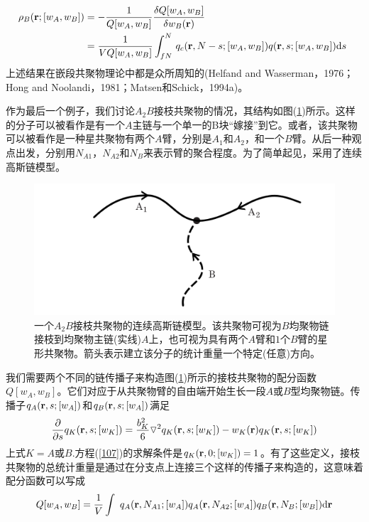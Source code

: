 \begin{equation}
\begin{aligned}
\rho _B(\mathbf{r};[w_A,w_B]) & =-\frac{1}{Q[w_A,w_B]}	\frac{\delta Q[w_A,w_B]}{\delta w_B(\mathbf{r})} \\
& =\frac{1}{VQ[w_A,w_B]} \int _{fN}^{N}\,q_c(\mathbf{r},N-s;[w_A,w_B])q(\mathbf{r},s;[w_A,w_B])\mathrm{d}s~ \\
\end{aligned}	
\end{equation}
上述结果在嵌段共聚物理论中都是众所周知的(Helfand and Wasserman，1976；Hong and Noolandi，1981；Matsen和Schick，1994a)。

作为最后一个例子，我们讨论$A_2B$接枝共聚物的情况，其结构如图(\ref{3.8})所示。这样的分子可以被看作是有一个$A$主链与一个单一的B块“嫁接”到它。或者，该共聚物可以被看作是一种星共聚物有两个$A$臂，分别是$A_1$和$A_2$，和一个$B$臂。从后一种观点出发，分别用$N_{A1}$，$N_{A2}$和$N_B$来表示臂的聚合程度。为了简单起见，采用了连续高斯链模型。

\begin{figure}[H]
\centering
\includegraphics[scale=0.7]{./figures/38.png}
\caption{一个$A_2B$接枝共聚物的连续高斯链模型。该共聚物可视为$B$均聚物链接枝到均聚物主链(实线)$A$上，也可视为具有两个$A$臂和$1$个$B$臂的星形共聚物。箭头表示建立该分子的统计重量一个特定(任意)方向。}
\label{3.8}
\end{figure}		

我们需要两个不同的链传播子来构造图(\ref{3.8})所示的接枝共聚物的配分函数$Q[w_A,w_B]$。它们对应于从共聚物臂的自由端开始生长一段$A$或$B$型均聚物链。传播子$q_A(\mathbf{r},s;[w_A])$和$q_B(\mathbf{r},s;[w_A])$满足
\begin{equation}
\frac{\partial}{\partial s}q_K(\mathbf{r},s;[w_K])=\frac{b_K^2}{6}\triangledown ^2q_K(\mathbf{r},s;[w_K])-w_K(\mathbf{r})q_K(\mathbf{r},s;[w_K]) \label{107}
\end{equation}
上式$K=A$或$B$.方程(\ref{107})的求解条件是$q_K(\mathbf{r},0;[w_K])=1$。有了这些定义，接枝共聚物的总统计重量是通过在分支点上连接三个这样的传播子来构造的，这意味着配分函数可以写成
\begin{equation}
Q[w_A,w_B]=\frac{1}{V}\int ~q_A(\mathbf{r},N_{A1};[w_A])q_A(\mathbf{r},N_{A2};[w_A])q_B(\mathbf{r},N_B;[w_B]) \mathrm{d}\mathbf{r}
\end{equation}

